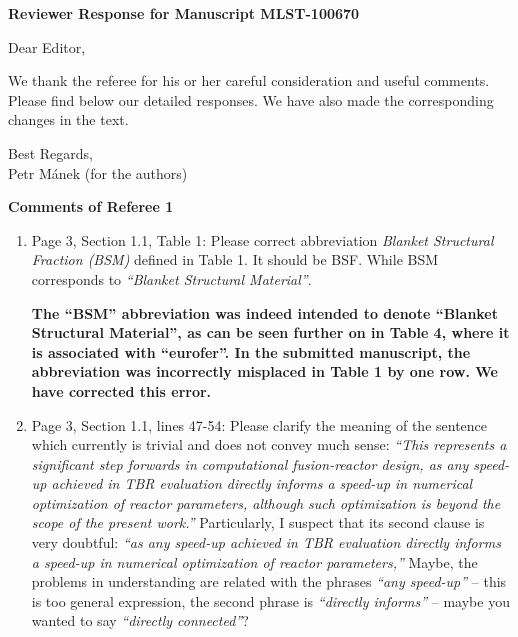 \documentclass[12pt]{article}
\date{\today}
\begin{document}
\begin{center}
\bf Reviewer Response for Manuscript MLST-100670
\end{center}

\bigskip

\noindent
Dear Editor,

\bigskip
\noindent
We thank the referee for his or her careful consideration and useful comments.
Please find below our detailed responses. We have also made the corresponding
changes in the text.

\bigskip
\noindent
Best Regards,\\
Petr Mánek (for the authors)

\bigskip
\bigskip
\bigskip
\noindent
{\bf Comments of Referee 1}

\begin{enumerate}

\item Page 3, Section 1.1, Table 1: Please correct abbreviation \textit{Blanket
	Structural Fraction (BSM)} defined in Table 1. It should be BSF. While BSM
	corresponds to \textit{``Blanket Structural Material''}.

{\bf
	The ``BSM'' abbreviation was indeed intended to denote ``Blanket
	Structural Material'', as can be seen further on in Table 4, where it is
	associated with ``eurofer''. In the submitted manuscript, the abbreviation
	was incorrectly misplaced in Table 1 by one row. We have corrected this
	error.
}

\item Page 3, Section 1.1, lines 47-54: Please clarify the meaning of the
	sentence which currently is trivial and does not convey much sense:
	\textit{``This represents a significant step forwards in computational
		fusion-reactor design, as any speed-up achieved in TBR evaluation
		directly informs a speed-up in numerical optimization of reactor
		parameters, although such optimization is beyond the scope of the
		present work.''} Particularly, I suspect that its second clause is very
		doubtful: \textit{``as any speed-up achieved in TBR evaluation directly
		informs a speed-up in numerical optimization of reactor parameters,''}
		Maybe, the problems in understanding are related with the phrases
		\textit{``any speed-up''} -- this is too general expression, the second
		phrase is \textit{``directly informs''} -- maybe you wanted to say
		\textit{``directly connected''}?


\end{enumerate}
\end{document}

